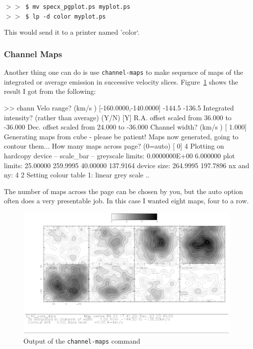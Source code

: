 \documentclass[11pt,twoside]{starlink}
\providecommand{\SP}{{$>\!>$}}
\begin{document}
\SP\ \verb|$ mv specx_pgplot.ps myplot.ps|\\
\SP\ \verb|$ lp -d color myplot.ps|

This would send it to a printer named 'color`.

\subsubsection{Channel Maps}
\label{sec:specx_13.5}
Another thing one can do is use \texttt{channel-maps} to make sequence of
maps of the integrated or average emission in successive velocity
slices.  Figure~\ref{fig:specx_chann_maps} shows the result I got from
the following:

\begin{terminalv}
>> chann
Velo range? (km/s  ) [-160.0000,-140.0000] -144.5 -136.5
Integrated intensity? (rather than average) (Y/N) [Y]
R.A. offset scaled from   36.000 to  -36.000
Dec. offset scaled from   24.000 to  -36.000
Channel width? (km/s  ) [     1.000]
Generating maps from cube - please be patient!
Maps now generated, going to contour them...
How many maps across page? (0=auto) [ 0] 4
Plotting on hardcopy device
 -- scale_bar --
    greyscale limits:   0.0000000E+00   6.000000
    plot limits:         25.00000       259.9995       40.00000
  137.9164
    device size:         264.9995       197.7896
    nx and ny:                   4           2
Setting colour table 1: linear grey scale
..
\end{terminalv}

The number of maps across the page can be chosen by you, but the auto
option often does a very presentable job. In this case I wanted eight
maps, four to a row.

\begin{figure}[htb]
\centering
\includegraphics[width=\textwidth]{sc8_chann}
\caption[Velocity slices]
{\small{Output of the \texttt{channel-maps} command}
}
\label{fig:specx_chann_maps}
\end{figure}
\end{document}

